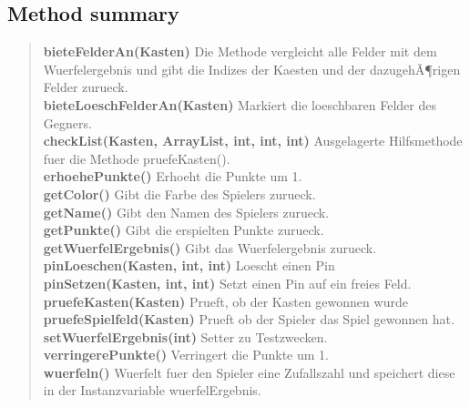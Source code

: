 \documentclass[11pt,a4paper]{report}
\begin{document}
{{{{{{{{{{\subsection{Method summary}{
\begin{verse}
{\bf bieteFelderAn(Kasten\lbrack \rbrack )} Die Methode vergleicht alle Felder mit dem Wuerfelergebnis und gibt die Indizes der Kaesten und der dazugehÃ¶rigen Felder zurueck.\\
{\bf bieteLoeschFelderAn(Kasten\lbrack \rbrack )} Markiert die loeschbaren Felder des Gegners.\\
{\bf checkList(Kasten, ArrayList, int, int, int)} Ausgelagerte Hilfsmethode fuer die Methode pruefeKasten().\\
{\bf erhoehePunkte()} Erhoeht die Punkte um 1.\\
{\bf getColor()} Gibt die Farbe des Spielers zurueck.\\
{\bf getName()} Gibt den Namen des Spielers zurueck.\\
{\bf getPunkte()} Gibt die erspielten Punkte zurueck.\\
{\bf getWuerfelErgebnis()} Gibt das Wuerfelergebnis zurueck.\\
{\bf pinLoeschen(Kasten\lbrack \rbrack , int, int)} Loescht einen Pin\\
{\bf pinSetzen(Kasten\lbrack \rbrack , int, int)} Setzt einen Pin auf ein freies Feld.\\
{\bf pruefeKasten(Kasten)} Prueft, ob der Kasten gewonnen wurde\\
{\bf pruefeSpielfeld(Kasten\lbrack \rbrack )} Prueft ob der Spieler das Spiel gewonnen hat.\\
{\bf setWuerfelErgebnis(int)} Setter zu Testzwecken.\\
{\bf verringerePunkte()} Verringert die Punkte um 1.\\
{\bf wuerfeln()} Wuerfelt fuer den Spieler eine Zufallszahl und speichert diese in der Instanzvariable wuerfelErgebnis.\\
\end{verse}
}
}}}}}}}}}}
\end{document}
